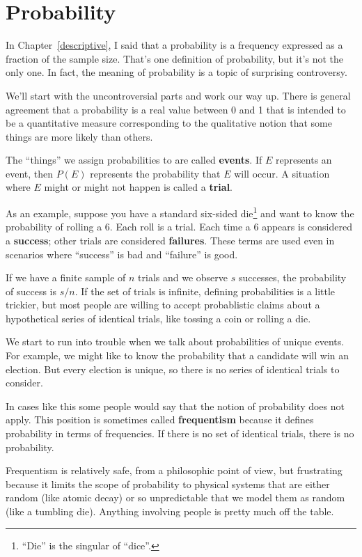 \documentclass[12pt]{book}
\begin{document}
\chapter{Probability}
\label{probability}

In Chapter~\ref{descriptive}, I said that a probability is a frequency
expressed as a fraction of the sample size.  That's one definition of
probability, but it's not the only one.  In fact, the meaning
of probability is a topic of surprising controversy.

We'll start with the uncontroversial parts and work our way up.  There
is general agreement that a probability is a real value between 0 and
1 that is intended to be a quantitative measure corresponding to the
qualitative notion that some things are more likely than others.

The ``things'' we assign probabilities to are called {\bf events}.  If
$E$ represents an event, then $P(E)$ represents the probability that
$E$ will occur.  A situation where $E$ might or might not happen is
called a {\bf trial}.

As an example, suppose you have a standard six-sided
die\footnote{``Die'' is the singular of ``dice''.} and want to know
the probability of rolling a 6.  Each roll is a trial.
Each time a 6 appears is considered a {\bf success}; other trials are
considered {\bf failures}.  These terms are used even in scenarios
where ``success'' is bad and ``failure'' is good.

If we have a finite sample of $n$ trials and we observe $s$ successes,
the probability of success is $s/n$.  If the set of trials is
infinite, defining probabilities is a little trickier, but most people
are willing to accept probablistic claims about a hypothetical series
of identical trials, like tossing a coin or rolling a die.

We start to run into trouble when we talk about probabilities of
unique events.  For example, we might like to know the probability
that a candidate will win an election.  But every election is unique,
so there is no series of identical trials to consider.

In cases like this some people would say that the notion of
probability does not apply.  This position is sometimes called {\bf
  frequentism} because it defines probability in terms of frequencies.
If there is no set of identical trials, there is no probability.

Frequentism is relatively safe, from a philosophic point of view, but
frustrating because it limits the scope of probability to physical
systems that are either random (like atomic decay) or so unpredictable
that we model them as random (like a tumbling die).  Anything involving
people is pretty much off the table.
\end{document}
